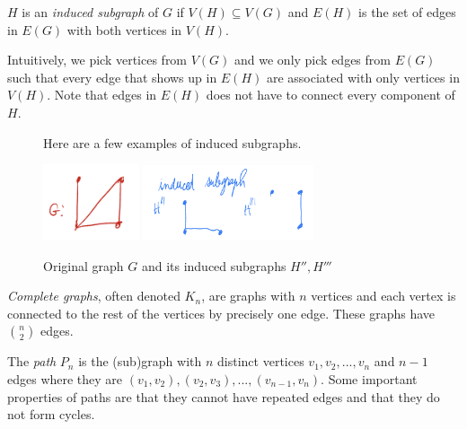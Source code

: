 \begin{definition}
  \(H\) is an \textit{induced subgraph} of \(G\) if \(V(H) \subseteq V(G)\) and \(E(H)\)
  is the set of edges in \(E(G)\) with both vertices in \(V(H)\). 

  Intuitively, we pick vertices from \(V(G)\) and we only pick edges from
  \(E(G)\) such that every edge that shows up in \(E(H)\) are associated with
  only vertices in \(V(H)\). Note that edges in \(E(H)\) does not have to
  connect every component of \(H\).
\end{definition}

\begin{figure}[ht]
\begin{nexample}
  Here are a few examples of induced subgraphs.

  \begin{center}
    \includegraphics[width=0.25\textwidth]{figures/l01/induced-original}
    \includegraphics[width=0.45\textwidth]{figures/l01/induced-subgraph}
    \caption{Original graph \(G\) and its induced subgraphs \(H'', H'''\)}\label{fig:induced-subgraph}
  \end{center}
\end{nexample}
\end{figure}

\begin{definition}
  \textit{Complete graphs}, often denoted \(K_n\), are graphs with \(n\) vertices and
  each vertex is connected to the rest of the vertices by precisely one edge.
  These graphs have \(\binom{n}{2}\) edges.
\end{definition}

\begin{definition}[Paths]
  The \textit{path} \(P_n\) is the (sub)graph with \(n\) distinct vertices \(v_1, v_2, ...,
  v_n\) and \(n-1\) edges where they are \((v_1, v_2), (v_2, v_3), ..., (v_{n-1}, v_n)\). Some important properties of paths are that they cannot have repeated edges and that they do not form cycles.
\end{definition}


